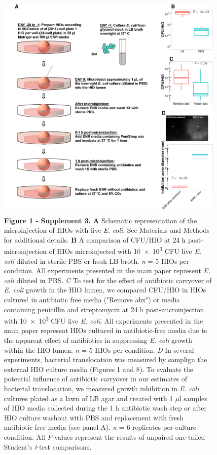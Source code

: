 \documentclass[9pt,lineo]{elife}
\begin{document}
\begin{figure}
\begin{fullwidth}
\centering\includegraphics[width=0.85\linewidth]{./figures/figure1/sfigure1-3_multipanel.pdf}
\caption*{\textbf{Figure 1 - Supplement 3. } \textbf{A} Schematic representation of the microinjection of HIOs with live \textit{E. coli}. See Materials and Methods for additional details. \textbf{B} A comparison of CFU/HIO at 24 h post-microinjection of HIOs microinjected with \num{10e3} CFU live \textit{E. coli} diluted in sterile PBS or fresh LB broth. \textit{n} = 5 HIOs per condition. All experiments presented in the main paper represent \textit{E. coli} diluted in PBS. \textit{C} To test for the effect of antibiotic carryover of \textit{E. coli} growth in the HIO lumen, we compared CFU/HIO in HIOs cultured in antibiotic free media ("Remove abx") or media containing penicillin and streptomycin at 24 h post-microinjection with \num{10e3} CFU live \textit{E. coli}. All experiments presented in the main paper represent HIOs cultured in antibiotic-free media due to the apparent effect of antibiotics in suppressing \textit{E. coli} growth within the HIO lumen. \textit{n} = 5 HIOs per condition. \textit{D} In several experiments, bacterial translocation was measured by samplign the external HIO culture media (Figures 1 and 8). To evaluate the potential influence of antibiotic carryover in our estimates of bacterial translocation, we measured growth inhibition in \textit{E. coli} cultures plated as a lawn of LB agar and treated with 1 $\mu$l samples of HIO media collected during the 1 h antibiotic wash step or after HIO culture washout with PBS and replacement with fresh antibiotic free media (see panel A). \textit{n} = 6 replicates per culture condition. All \textit{P}-values represent the results of unpaired one-tailed Student's \textit{t}-test comparisons.}
\label{fig:fullwidth}
\end{fullwidth}
\end{figure}
\end{document}
